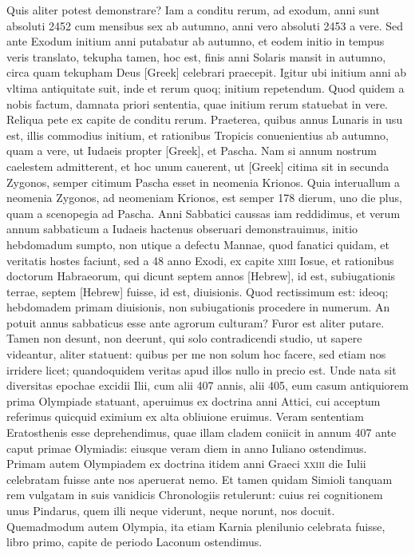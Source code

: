 Quis aliter potest demonstrare?
Iam a conditu rerum, ad exodum,
anni sunt absoluti 2452 cum mensibus sex ab autumno, anni vero
absoluti 2453 a vere.
Sed ante Exodum initium anni putabatur ab
autumno, et eodem initio in tempus veris translato, tekupha tamen,
hoc est, finis anni Solaris mansit in autumno, circa quam tekupham
Deus \textgreek{[Greek]} celebrari praecepit.
Igitur ubi initium anni
ab vltima antiquitate suit, inde et rerum quoq; initium repetendum.
Quod quidem a nobis factum, damnata priori sententia, quae
initium rerum statuebat in vere.
Reliqua pete ex capite de conditu
rerum.
Praeterea, quibus annus Lunaris in usu est, illis commodius
initium, et rationibus Tropicis conuenientius ab autumno, quam
a vere, ut Iudaeis propter \textgreek{[Greek]}, et Pascha.
Nam si annum
nostrum caelestem admitterent, et hoc unum cauerent, ut \textgreek{[Greek]}
citima sit in secunda Zygonos, semper citimum Pascha esset in neomenia
Krionos.
Quia interuallum a neomenia Zygonos, ad neomeniam
Krionos, est semper 178 dierum, uno die plus, quam a scenopegia
ad Pascha.
Anni Sabbatici caussas iam reddidimus, et verum
annum sabbaticum a Iudaeis hactenus obseruari demonstrauimus,
initio hebdomadum sumpto, non utique a defectu Mannae,
quod fanatici quidam, et veritatis hostes faciunt, sed a 48 anno Exodi,
ex capite \textsc{xiiii} Iosue, et rationibus doctorum Habraeorum, qui
dicunt septem annos \texthebrew{[Hebrew]}, id est, subiugationis terrae,
septem \texthebrew{[Hebrew]}
fuisse, id est, diuisionis.
Quod rectissimum est: ideoq; hebdomadem
primam diuisionis, non subiugationis procedere in numerum.
An
potuit annus sabbaticus esse ante agrorum culturam?
Furor est aliter putare.
Tamen non desunt, non deerunt, qui solo contradicendi
studio, ut sapere videantur, aliter statuent: quibus per me non solum
hoc facere, sed etiam nos irridere licet; quandoquidem veritas apud
illos nullo in precio est.
Unde nata sit diversitas epochae excidii Ilii,
cum alii 407 annis, alii 405, eum casum antiquiorem prima Olympiade
statuant, aperuimus ex doctrina anni Attici, cui acceptum
referimus quicquid eximium ex alta obliuione eruimus.
Veram sententiam
Eratosthenis esse deprehendimus, quae illam cladem coniicit
in annum 407 ante caput primae Olymiadis: eiusque veram
diem in anno Iuliano ostendimus.
Primam autem Olympiadem
ex doctrina itidem anni Graeci \textsc{xxiii} die Iulii celebratam fuisse ante
nos aperuerat nemo.
Et tamen quidam Simioli tanquam rem
vulgatam in suis vanidicis Chronologiis retulerunt: cuius rei cognitionem
unus Pindarus, quem illi neque viderunt, neque norunt, nos
docuit.
{}
Quemadmodum autem Olympia, ita etiam Karnia plenilunio
celebrata fuisse, libro primo, capite de periodo Laconum
ostendimus.

